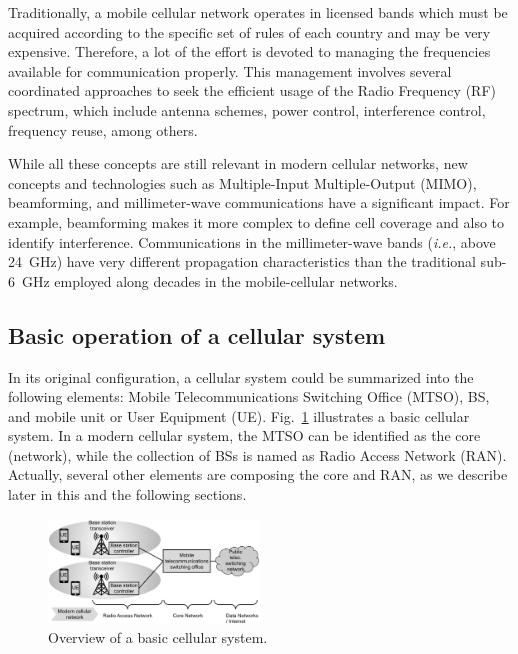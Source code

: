Traditionally, a mobile cellular network operates in licensed bands which must be acquired according to the specific set of rules of each country and may be very expensive. Therefore, a lot of the effort is devoted to managing the frequencies available for communication properly. This management involves several coordinated approaches to seek the efficient usage of the Radio Frequency (RF) spectrum, which include antenna schemes, power control, interference control, frequency reuse, among others.

While all these concepts are still relevant in modern cellular networks, new concepts and technologies such as Multiple-Input Multiple-Output (MIMO), beamforming, and millimeter-wave communications have a significant impact. For example, beamforming makes it more complex to define cell coverage and also to identify interference. Communications in the millimeter-wave bands (\textit{i.e.}, above 24~GHz) have very different propagation characteristics than the traditional sub-6~GHz employed along decades in the mobile-cellular networks.

\subsection{Basic operation of a cellular system}

In its original configuration, a cellular system could be summarized into the following elements: Mobile Telecommunications Switching Office (MTSO), BS, and mobile unit or User Equipment (UE). Fig.~\ref{fig:cell_system} illustrates a basic cellular system. In a modern cellular system, the MTSO can be identified as the core (network), while the collection of BSs is named as Radio Access Network (RAN). Actually, several other elements are composing the core and RAN, as we describe later in this and the following sections.

\begin{figure}[htb]
 \begin{center}
\includegraphics[width=0.5\textwidth]{figs/cell_system.pdf}
  \end{center}
\caption{Overview of a basic cellular system.}
\label{fig:cell_system}
\end{figure}

